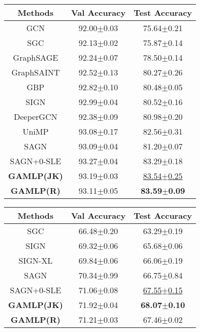 \documentclass[sigconf]{acmart}
\begin{document}
\begin{table}[tpb!]
     \centering
    \label{tab:products_perf}
     \begin{tabular}{c|cc}
    \toprule
    \textbf{Methods} & \textbf{Val Accuracy} & \textbf{Test Accuracy} \\
    \midrule
    GCN & 92.00$\pm$0.03 & 75.64$\pm$0.21 \\
    SGC & 92.13$\pm$0.02 & 75.87$\pm$0.14 \\
    GraphSAGE & 92.24$\pm$0.07 & 78.50$\pm$0.14 \\
    GraphSAINT & 92.52$\pm$0.13 & 80.27$\pm$0.26 \\
    GBP & 92.82$\pm$0.10 & 80.48$\pm$0.05 \\       
    SIGN & 92.99$\pm$0.04 & 80.52$\pm$0.16 \\
    DeeperGCN & 92.38$\pm$0.09 & 80.98$\pm$0.20 \\
    UniMP & 93.08$\pm$0.17 & 82.56$\pm$0.31 \\
    SAGN & 93.09$\pm$0.04 & 81.20$\pm$0.07 \\
    SAGN+0-SLE & 93.27$\pm$0.04 & 83.29$\pm$0.18\\
    \midrule
    \textbf{GAMLP(JK)} & 93.19$\pm$0.03 & \underline{83.54$\pm$0.25}  \\
    \textbf{GAMLP(R)} & 93.11$\pm$0.05 & \textbf{83.59$\pm$0.09}  \\
    \bottomrule
    \end{tabular}
    \vspace{-3mm}
\end{table}


\begin{table}[tpb!]
 \centering
\label{tab:100m_perf}
 \begin{tabular}{c|cc}
\toprule
\textbf{Methods} & \textbf{Val Accuracy} & \textbf{Test Accuracy} \\
\midrule
SGC & 66.48$\pm$0.20 & 63.29$\pm$0.19 \\
SIGN & 69.32$\pm$0.06 & 65.68$\pm$0.06 \\
SIGN-XL & 69.84$\pm$0.06 & 66.06$\pm$0.19 \\
SAGN & 70.34$\pm$0.99 & 66.75$\pm$0.84 \\
SAGN+0-SLE & 71.06$\pm$0.08 & \underline{67.55$\pm$0.15}\\
\midrule
\textbf{GAMLP(JK)} & 71.92$\pm$0.04 & \textbf{68.07$\pm$0.10}  \\
\textbf{GAMLP(R)} & 71.21$\pm$0.03 & 67.46$\pm$0.02  \\
\bottomrule
\end{tabular}
\vspace{-3mm}
\end{table}
  
\end{document}

